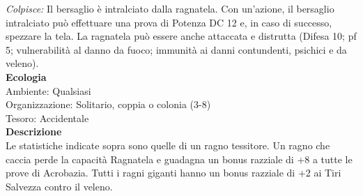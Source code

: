 \begin{multicols}{2}
\emph{Colpisce:} Il bersaglio è intralciato dalla ragnatela. Con un'azione, il bersaglio intralciato può effettuare una prova di Potenza DC 12 e, in caso di successo, spezzare la tela. La ragnatela può essere anche attaccata e distrutta (Difesa 10; pf 5; vulnerabilità al danno da fuoco; immunità ai danni contundenti, psichici e da veleno).\\
\textbf{Ecologia}\\
Ambiente: Qualsiasi\\
Organizzazione: Solitario, coppia o colonia (3-8)\\
Tesoro: Accidentale\\
\textbf{Descrizione}\\
Le statistiche indicate sopra sono quelle di un ragno tessitore. Un ragno che caccia perde la capacità Ragnatela e guadagna un bonus razziale di +8 a tutte le prove di Acrobazia. Tutti i ragni giganti hanno un bonus razziale di +2 ai Tiri Salvezza contro il veleno.\\


\end{multicols}
